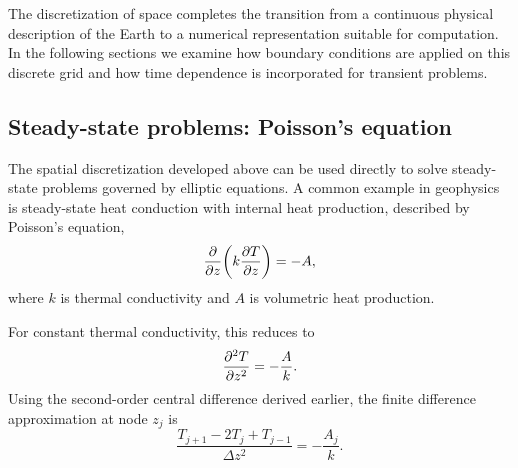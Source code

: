 The discretization of space completes the transition from a continuous physical description of the Earth to a numerical representation suitable for computation. In the following sections we examine how boundary conditions are applied on this discrete grid and how time dependence is incorporated for transient problems.

\subsection{Steady-state problems: Poisson's equation}

The spatial discretization developed above can be used directly to solve
steady-state problems governed by elliptic equations. A common example in
geophysics is steady-state heat conduction with internal heat production,
described by Poisson's equation,
\[
    \pdv{}{z}\!\left(k \pdv{T}{z}\right) = -A,
\]
where $k$ is thermal conductivity and $A$ is volumetric heat production.

For constant thermal conductivity, this reduces to
\[
    \pdv[2]{T}{z} = -\frac{A}{k}.
\]
Using the second-order central difference derived earlier, the finite
difference approximation at node $z_j$ is
\[
    \frac{T_{j+1} - 2T_j + T_{j-1}}{\Delta z^2} = -\frac{A_j}{k}.
\]

